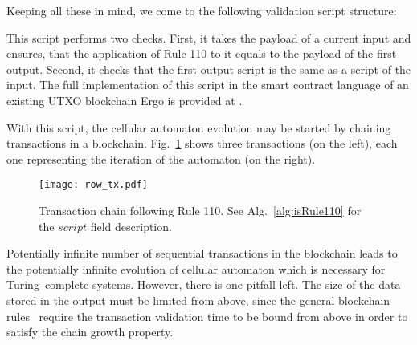 \documentclass[runningheads]{llncs}
\begin{document}
    Keeping all these in mind, we come to the following validation
    script structure:
    
    This script performs two checks. First, it takes the payload of a current input
    and ensures, that the application of Rule 110 to it equals to the payload
    of the first output. Second, it checks that the first output script is the same
    as a script of the input. The full implementation of this script in the smart
    contract language of an existing UTXO blockchain Ergo is provided at \cite{ergoScript1}.

    With this script, the cellular automaton evolution may be started by
    chaining transactions in a blockchain. Fig.~\ref{fig:txs} shows three
    transactions (on the left), each one representing the iteration of the 
    automaton (on the right).

    \begin{figure}[h]
        \centering
        \texttt{[image: row\_tx.pdf]}
        \caption{Transaction chain following Rule 110. See
            Alg.~\ref{alg:isRule110} for the
            $script$ field description.
        \label{fig:txs} }
    \end{figure}
    Potentially infinite number of sequential transactions in the blockchain
    leads to the potentially infinite evolution of cellular automaton which is
    necessary for Turing--complete systems.  However, there is one pitfall left.
    The size of the data stored in the output must be limited from above, since
    the general blockchain rules~\cite{garay2015bitcoin} require the transaction
    validation time to be bound from above in order to satisfy the chain growth
    property.
\end{document}

